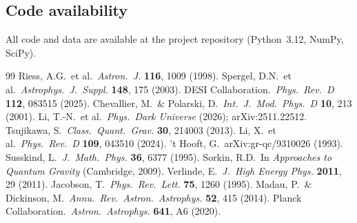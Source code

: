 \documentclass[12pt,a4paper]{article}
\begin{document}
\subsection*{Code availability}
All code and data are available at the project repository (Python~3.12, NumPy, SciPy).

\begin{thebibliography}{99}
 Riess, A.G.\ et al.\ {\it Astron.\ J.} {\bf 116}, 1009 (1998).
 Spergel, D.N.\ et al.\ {\it Astrophys.\ J.\ Suppl.} {\bf 148}, 175 (2003).
 DESI Collaboration.\ {\it Phys.\ Rev.\ D} {\bf 112}, 083515 (2025).
 Chevallier, M.\ \& Polarski, D.\ {\it Int.\ J.\ Mod.\ Phys.\ D} {\bf 10}, 213 (2001).
 Li, T.-N.\ et al.\ {\it Phys.\ Dark Universe} (2026); arXiv:2511.22512.
 Tsujikawa, S.\ {\it Class.\ Quant.\ Grav.} {\bf 30}, 214003 (2013).
 Li, X.\ et al.\ {\it Phys.\ Rev.\ D} {\bf 109}, 043510 (2024).
 't Hooft, G.\ arXiv:gr-qc/9310026 (1993).
 Susskind, L.\ {\it J.\ Math.\ Phys.} {\bf 36}, 6377 (1995).
 Sorkin, R.D.\ In {\it Approaches to Quantum Gravity} (Cambridge, 2009).
 Verlinde, E.\ {\it J.\ High Energy Phys.} {\bf 2011}, 29 (2011).
 Jacobson, T.\ {\it Phys.\ Rev.\ Lett.} {\bf 75}, 1260 (1995).
 Madau, P.\ \& Dickinson, M.\ {\it Annu.\ Rev.\ Astron.\ Astrophys.} {\bf 52}, 415 (2014).
 Planck Collaboration.\ {\it Astron.\ Astrophys.} {\bf 641}, A6 (2020).
\end{thebibliography}
\end{document}
